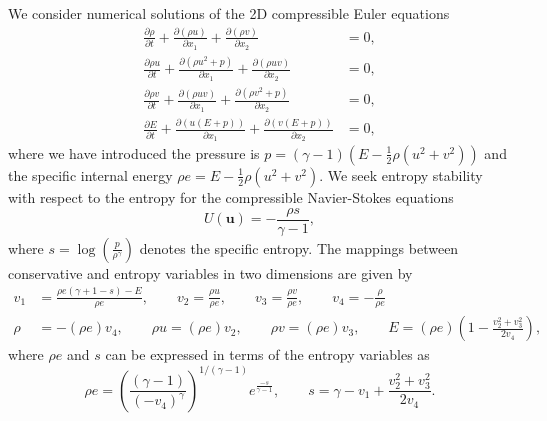 \documentclass{svjour3}                     %
\newcommand{\pd}[2]{\frac{\partial#1}{\partial#2}}
\newcommand{\LRp}[1]{\left( #1 \right)}
\begin{document}
We consider numerical solutions of the 2D compressible Euler equations
\begin{align*}
\pd{\rho}{t} + \pd{\LRp{\rho u}}{x_1} + \pd{\LRp{\rho v}}{x_2} &= 0,\\
\pd{\rho u}{t} + \pd{\LRp{\rho u^2 + p }}{x_1} + \pd{\LRp{\rho uv}}{x_2} &= 0,\nonumber\\
\pd{\rho v}{t} + \pd{\LRp{\rho uv}}{x_1} + \pd{\LRp{\rho v^2 + p }}{x_2} &= 0,\nonumber\\
\pd{E}{t} + \pd{\LRp{u(E+p)}}{x_1} + \pd{\LRp{v(E+p)}}{x_2}&= 0,\nonumber
\end{align*}
where we have introduced the pressure is $p = (\gamma-1)\LRp{E - \frac{1}{2}\rho (u^2+v^2)}$ and the specific internal energy $\rho e = E - \frac{1}{2}\rho (u^2+v^2)$.  We seek entropy stability with respect to the entropy for the compressible Navier-Stokes equations \cite{hughes1986new}
\begin{equation*}
U(\bm{u}) = -\frac{\rho s}{\gamma-1},
\label{eq:entropy2d}
\end{equation*}
where $s = \log\LRp{\frac{p}{\rho^\gamma}}$ denotes the specific entropy. The mappings between conservative and entropy variables in two dimensions are given by
\begin{align*}
v_1 &= \frac{\rho e (\gamma + 1 - s) - E}{\rho e}, \qquad v_2 = \frac{\rho u}{\rho e}, \qquad v_3 = \frac{\rho v}{\rho e}, \qquad v_4 = -\frac{\rho}{\rho e}\\
\rho &= -(\rho e) v_4, \qquad \rho u = (\rho e) v_2, \qquad \rho v = (\rho e) v_3, \qquad E = (\rho e)\LRp{1 - \frac{{v_2^2+v_3^2}}{2 v_4}},
\end{align*}
where $\rho e$ and $s$ can be expressed in terms of the entropy variables as
\begin{equation*}
\rho e = \LRp{\frac{(\gamma-1)}{\LRp{-v_4}^{\gamma}}}^{1/(\gamma-1)}e^{\frac{-s}{\gamma-1}}, \qquad s = \gamma - v_1 + \frac{{v_2^2+v_3^2}}{2v_4}.
\end{equation*}
\end{document}
